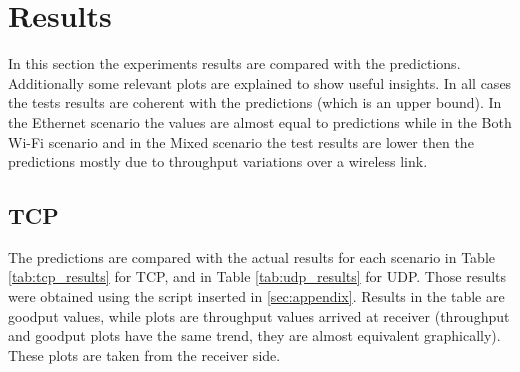 \section{Results}
\label{sec:results}
In this section the experiments results are compared with the predictions. Additionally some relevant plots are explained to show useful insights. In all cases the tests results are coherent with the predictions (which is an upper bound). In the Ethernet scenario the values are almost equal to predictions while in the Both Wi-Fi scenario and in the Mixed scenario the test results are lower then the predictions mostly due to throughput variations over a wireless link.

\subsection{TCP}
The predictions are compared with the actual results for each scenario in Table \ref{tab:tcp_results} for TCP, and in Table \ref{tab:udp_results} for UDP. Those results were obtained using the script inserted in \ref{sec:appendix}. Results in the table are goodput values, while plots are throughput values arrived at receiver (throughput and goodput plots have the same trend, they are almost equivalent graphically). These plots are taken from the receiver side.\\

\vspace{-13pt}

